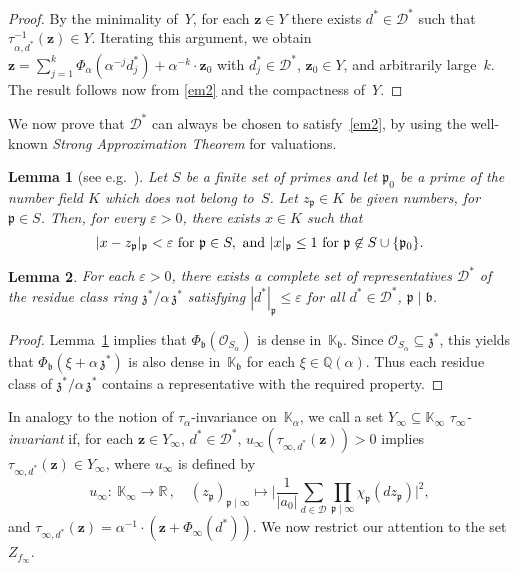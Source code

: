 \documentclass[12pt]{amsart}
\newtheorem{lemma}{Lemma}[section]
\theoremstyle{definition}
\theoremstyle{remark}
\numberwithin{equation}{section}
\begin{document}
\begin{proof}
By the minimality of~$Y$, for each $\mathbf{z} \in Y$ there exists $d^* \in \mathcal{D}^*$ such that $\tau_{\alpha,d^*}^{-1}(\mathbf{z}) \in Y$.
Iterating this argument, we obtain $\mathbf{z} = \sum_{j=1}^k \Phi_\alpha(\alpha^{-j} d^*_j) + \alpha^{-k} \cdot \mathbf{z}_0$ with $d^*_j \in \mathcal{D}^*$, $\mathbf{z}_0 \in Y$, and arbitrarily large~$k$.
The result follows now from \eqref{em2} and the compactness of~$Y$.
\end{proof}

We now prove that $\mathcal{D}^*$ can always be chosen to satisfy~\eqref{em2}, by using the well-known \emph{Strong Approximation Theorem} for valuations.

\begin{lemma}[{see e.g.\ \cite[Section~15]{Cassels:67}}]\label{strongapprox}
Let $S$ be a finite set of primes and let $\mathfrak{p}_0$ be a prime of the number field $K$ which does not belong to~$S$.
Let $z_\mathfrak{p} \in K$ be given numbers, for $\mathfrak{p} \in S$.
Then, for every $\varepsilon > 0$, there exists $x \in K$ such that
\[
|x - z_\mathfrak{p}|_\mathfrak{p} < \varepsilon\ \hbox{for}\ \mathfrak{p} \in S,\ \hbox{and}\ |x|_\mathfrak{p} \le 1\ \hbox{for}\ \mathfrak{p} \not\in S \cup \{\mathfrak{p}_0\}.
\]
\end{lemma}

\begin{lemma}\label{residueSystemLemma}
For each $\varepsilon > 0$, there exists a complete set of representatives $\mathcal{D}^*$ of the residue class ring  $\mathfrak{z}^* / \alpha\, \mathfrak{z}^*$ satisfying $|d^*|_\mathfrak{p} \le \varepsilon$ for all $d^* \in \mathcal{D}^*$, $\mathfrak{p} \mid \mathfrak{b}$.
\end{lemma}

\begin{proof}
Lemma~\ref{strongapprox} implies that $\Phi_\mathfrak{b}(\mathcal{O}_{S_\alpha})$ is dense in~$\mathbb{K}_\mathfrak{b}$.
Since $\mathcal{O}_{S_\alpha} \subseteq \mathfrak{z}^*$, this yields that $\Phi_\mathfrak{b}({\xi + \alpha\, \mathfrak{z}^*})$ is also dense in~$\mathbb{K}_\mathfrak{b}$ for each $\xi \in \mathbb{Q}(\alpha)$.
Thus each residue class of $\mathfrak{z}^* / \alpha\, \mathfrak{z}^*$ contains a representative with the required property.
\end{proof}

In analogy to the notion of $\tau_\alpha$-invariance on~$\mathbb{K}_\alpha$, we call a set $Y_\infty \subseteq \mathbb{K}_\infty$ \emph{$\tau_\infty$-invariant} if, for each $\mathbf{z} \in Y_\infty$, $d^*
\in \mathcal{D}^*$, $u_\infty(\tau_{\infty,d^*}(\mathbf{z})) > 0$ implies $\tau_{\infty,d^*}(\mathbf{z}) \in Y_\infty$, where $u_\infty$ is defined by
\[
u_\infty:\ \mathbb{K}_\infty \to \mathbb{R}\,, \quad (z_\mathfrak{p})_{\mathfrak{p}\mid\infty} \mapsto \bigg|\frac{1}{|a_0|} \sum_{d \in \mathcal{D}} \prod_{\mathfrak{p}\mid\infty} \chi_\mathfrak{p}(d z_\mathfrak{p})\bigg|^2,
\]
and $\tau_{\infty,d^*}(\mathbf{z}) = \alpha^{-1} \cdot (\mathbf{z} + \Phi_\infty(d^*))$.
We now restrict our attention to the set $Z_{f_\infty}$.
\end{document}
